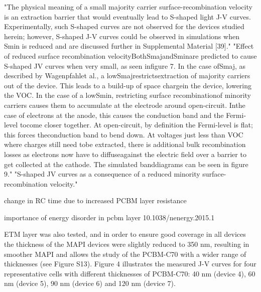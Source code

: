 "The physical meaning of a small majority carrier surface-recombination velocity is an extraction barrier that would eventually lead to S-shaped light J-V curves. Experimentally, such S-shaped curves are not observed for the devices studied herein; however, S-shaped J-V curves could be observed in simulations when Smin is reduced and are discussed further in Supplemental Material [39]."
"Effect of reduced surface recombination velocityBothSmajandSminare predicted to cause S-shaped JV curves when very small, as seen infigure 7.  In the case ofSmaj,  as described by Wagenpfahlet al.,  a lowSmajrestrictsextraction of majority carriers out of the device.  This leads to a build-up of space chargein the device, lowering the VOC.  In the case of a lowSmin, restricting surface recombinationof  minority  carriers  causes  them  to  accumulate  at  the  electrode  around  open-circuit.   Inthe case of electrons at the anode, this causes the conduction band and the Fermi-level tocome closer together.  At open-circuit, by definition the Fermi-level is flat;  this forces theconduction band to bend down.  At voltages just less than VOC where charges still need tobe extracted, there is additional bulk recombination losses as electrons now have to diffuseagainst the electric field over a barrier to get collected at the cathode.  The simulated banddiagrams can be seen in figure 9."
"S-shaped JV curves as a consequence of a reduced minority surface-recombination velocity." \cite{Wheeler2015}

change in RC time due to increased PCBM layer resistance \cite{Wheeler2017}

importance of energy disorder in pcbm layer 10.1038/nenergy.2015.1





ETM layer was also tested, and in order to ensure good coverage in all devices the thickness of the MAPI devices were slightly reduced to 350 nm, resulting in smoother MAPI and allows the study of the PCBM-C70 with a wider range of thicknesses (see Figure S13). 
Figure 4 illustrates the measured J-V curves for four representative cells with different thicknesses of PCBM-C70: 40 nm (device 4), 60 nm (device 5), 90 nm (device 6) and 120 nm (device 7).

